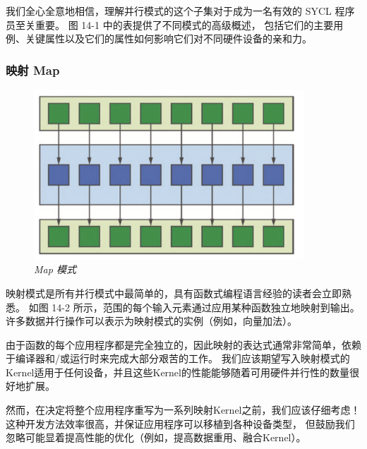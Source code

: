 我们全心全意地相信，理解并行模式的这个子集对于成为一名有效的 SYCL 程序员至关重要。 
图 14-1 中的表提供了不同模式的高级概述，
包括它们的主要用例、关键属性以及它们的属性如何影响它们对不同硬件设备的亲和力。

\subsubsection{映射 Map}
\begin{figure}[H]
	\centering
	\includegraphics[width=0.9\textwidth]{figs/F14.2.png}
	\caption{\textit{Map 模式 }}
\end{figure}

映射模式是所有并行模式中最简单的，具有函数式编程语言经验的读者会立即熟悉。 
如图 14-2 所示，范围的每个输入元素通过应用某种函数独立地映射到输出。 
许多数据并行操作可以表示为映射模式的实例（例如，向量加法）。

由于函数的每个应用程序都是完全独立的，因此映射的表达式通常非常简单，依赖于编译器和/或运行时来完成大部分艰苦的工作。 
我们应该期望写入映射模式的Kernel适用于任何设备，并且这些Kernel的性能能够随着可用硬件并行性的数量很好地扩展。

然而，在决定将整个应用程序重写为一系列映射Kernel之前，我们应该仔细考虑！ 
这种开发方法效率很高，并保证应用程序可以移植到各种设备类型，
但鼓励我们忽略可能显着提高性能的优化（例如，提高数据重用、融合Kernel）。

